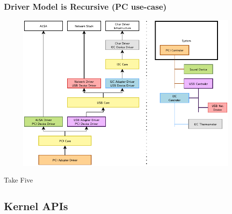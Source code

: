 \documentclass[aspectratio=169,usenames,dvipsnames]{beamer}
\begin{document}
\begin{frame}
  \frametitle{Driver Model is Recursive (PC use-case)}
  \vspace*{-3mm}
  \begin{figure}
    \centering
    \includegraphics[scale=0.95]{images/driver-model.pdf}
  \end{figure}
  \vspace*{-12mm}
\end{frame}

\begin{frame}[standout]
  Take Five
\end{frame}


\subsection{Kernel APIs}
\end{document}
